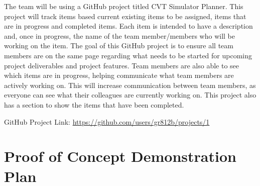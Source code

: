 \documentclass{article}
\begin{document}
The team will be using a GitHub project titled CVT Simulator Planner. 
This project will track items based current existing items to be assigned, items that are in progress and completed items. Each item is intended to have a description and, once in progress, the name of the team member/members who will be working on the item.
The goal of this GitHub project is to ensure all team members are on the same page regarding what needs to be started for upcoming project deliverables and project features. 
Team members are also able to see which items are in progress, helping communicate what team members are actively working on.
This will increase communication between team members, as everyone can see what their colleagues are currently working on.
This project also has a section to show the items that have been completed. 

\noindent GitHub Project Link: \url{https://github.com/users/gr812b/projects/1}

\section{Proof of Concept Demonstration Plan}
\end{document}
